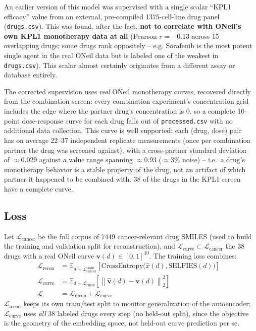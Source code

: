 \documentclass[11pt]{article}
\begin{document}
An earlier version of this model was supervised with a single scalar ``KPL1 efficacy'' value from an external, pre-compiled 1375-cell-line drug panel (\texttt{drugs.csv}). This was found, after the fact, \textbf{not to correlate with ONeil's own KPL1 monotherapy data at all} (Pearson $r = -0.13$ across 15 overlapping drugs; some drugs rank oppositely -- e.g. Sorafenib is the most potent single agent in the real ONeil data but is labeled one of the weakest in \texttt{drugs.csv}). This scalar almost certainly originates from a different assay or database entirely.

The corrected supervision uses \emph{real} ONeil monotherapy curves, recovered directly from the combination screen: every combination experiment's concentration grid includes the edge where the partner drug's concentration is $0$, so a complete 10-point dose-response curve for each drug falls out of \texttt{processed.csv} with no additional data collection. This curve is well supported: each (drug, dose) pair has on average 22--37 independent replicate measurements (once per combination partner the drug was screened against), with a cross-partner standard deviation of $\approx 0.029$ against a value range spanning $\approx 0.93$ ($\approx 3\%$ noise) -- i.e.\ a drug's monotherapy behavior is a stable property of the drug, not an artifact of which partner it happened to be combined with. 38 of the drugs in the KPL1 screen have a complete curve.

\subsection{Loss}

Let $\mathcal{L}_{\mathrm{cancer}}$ be the full corpus of 7449 cancer-relevant drug SMILES (used to build the training and validation split for reconstruction), and $\mathcal{L}_{\mathrm{curve}} \subset \mathcal{L}_{\mathrm{cancer}}$ the 38 drugs with a real ONeil curve $\mathbf{v}(d) \in [0,1]^{10}$. The training loss combines:
\begin{align}
\mathcal{L}_{\mathrm{recon}} &= \mathbb{E}_{d \sim \mathcal{L}_{\mathrm{cancer}}^{\mathrm{train}}} \left[ \mathrm{CrossEntropy}\big(\hat{x}(d), \mathrm{SELFIES}(d)\big) \right] \\
\mathcal{L}_{\mathrm{curve}} &= \mathbb{E}_{d \sim \mathcal{L}_{\mathrm{curve}}} \left[ \left\| \hat{\mathbf{v}}(d) - \mathbf{v}(d) \right\|_2^2 \right] \\
\mathcal{L} &= \mathcal{L}_{\mathrm{recon}} + \mathcal{L}_{\mathrm{curve}}
\end{align}
$\mathcal{L}_{\mathrm{recon}}$ keeps its own train/test split to monitor generalization of the autoencoder; $\mathcal{L}_{\mathrm{curve}}$ uses \emph{all} 38 labeled drugs every step (no held-out split), since the objective is the geometry of the embedding space, not held-out curve prediction per se.
\end{document}
